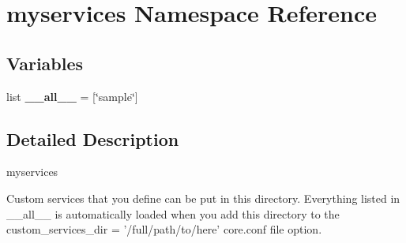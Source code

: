 \hypertarget{namespacemyservices}{\section{myservices Namespace Reference}
\label{namespacemyservices}
}
\subsection*{Variables}
\begin{DoxyCompactItemize}
\item 
\hypertarget{namespacemyservices_acbe552f218aa4a14b961367a667a04b3}{list {\bfseries \+\_\+\+\_\+all\+\_\+\+\_\+} = \mbox{[}\char`\"{}sample\char`\"{}\mbox{]}}\label{namespacemyservices_acbe552f218aa4a14b961367a667a04b3}

\end{DoxyCompactItemize}


\subsection{Detailed Description}
\begin{DoxyVerb}myservices

Custom services that you define can be put in this directory.  Everything
listed in __all__ is automatically loaded when you add this directory to the
custom_services_dir = '/full/path/to/here' core.conf file option.
\end{DoxyVerb}
 